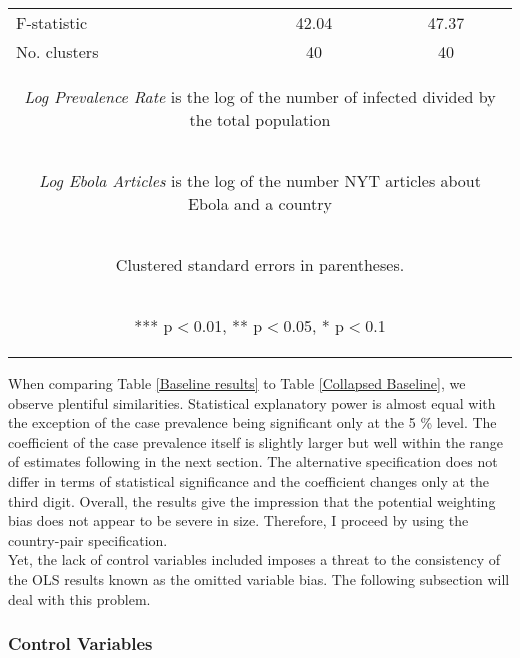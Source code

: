 \documentclass{article}
\begin{document}
\begin{table}[htbp]
\begin{tabular}{lcc}
F-statistic & 42.04 & 47.37 \\
No. clusters & 40 & 40 \\ \hline
\multicolumn{3}{c}{\begin{footnotesize} \textit{Log Prevalence Rate} is the log of the number of infected divided by the total population \end{footnotesize} }\\
\multicolumn{3}{c}{\begin{footnotesize} \textit{Log Ebola Articles} is the log of the number NYT articles about Ebola and a country \end{footnotesize} }\\
\multicolumn{3}{c}{\begin{footnotesize} Clustered standard errors in parentheses. \end{footnotesize} }\\
\multicolumn{3}{c}{\begin{footnotesize} *** p$<$0.01, ** p$<$0.05, * p$<$0.1\end{footnotesize}} \\
\end{tabular}
\end{table}

When comparing Table \ref{Baseline results} to Table \ref{Collapsed Baseline}, we observe plentiful similarities. Statistical explanatory power is almost equal with the exception of the case prevalence being significant only at the 5 \% level. The coefficient of the case prevalence itself is slightly larger but well within the range of estimates following in the next section. The alternative specification does not differ in terms of statistical significance and the coefficient changes only at the third digit. Overall, the results give the impression that the potential weighting bias does not appear to be severe in size. Therefore, I proceed by using the country-pair specification. \\
Yet, the lack of control variables included imposes a threat to the consistency of the OLS results known as the omitted variable bias. The following subsection will deal with this problem.

\subsubsection{Control Variables}
\end{document}
